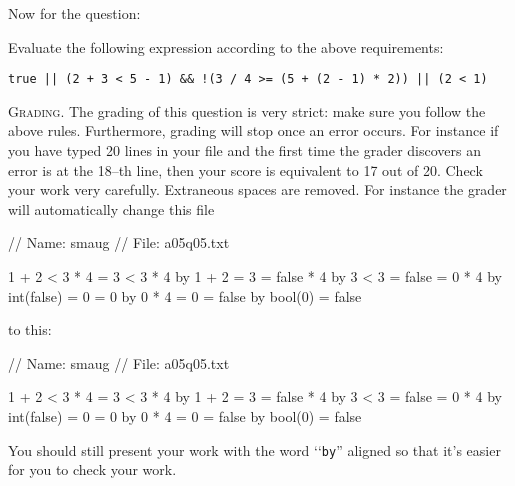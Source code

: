Now for the question:

Evaluate the following expression according to the above
requirements:
\begin{Verbatim}[frame=single]
true || (2 + 3 < 5 - 1) && !(3 / 4 >= (5 + (2 - 1) * 2)) || (2 < 1)
\end{Verbatim}

\textsc{Grading.}
The grading of this question is very strict: make sure you
follow the above rules.
Furthermore, grading will stop once an error occurs.
For instance if you have typed 20 lines in your file and
the first time the grader discovers an error is at the 18--th line, then
your score is equivalent to 17 out of 20.
Check your work very carefully.
Extraneous spaces are removed.
For instance the grader will automatically change this file
\begin{console}
// Name: smaug
// File: a05q05.txt

1 + 2 < 3 * 4
= 3 < 3 * 4                                       by 1 + 2 = 3
= false * 4                                       by 3 < 3 = false
= 0 * 4                                           by int(false) = 0
= 0                                               by 0 * 4 = 0
= false                                           by bool(0) = false
\end{console}
to this:
\begin{console}
// Name: smaug
// File: a05q05.txt

1 + 2 < 3 * 4 
= 3 < 3 * 4 by 1 + 2 = 3
= false * 4 by 3 < 3 = false
= 0 * 4 by int(false) = 0
= 0 by 0 * 4 = 0
= false by bool(0) = false
\end{console}
You should still present your work with the word \lq\lq \verb!by!'' aligned
so that it's easier for you to check your work.
